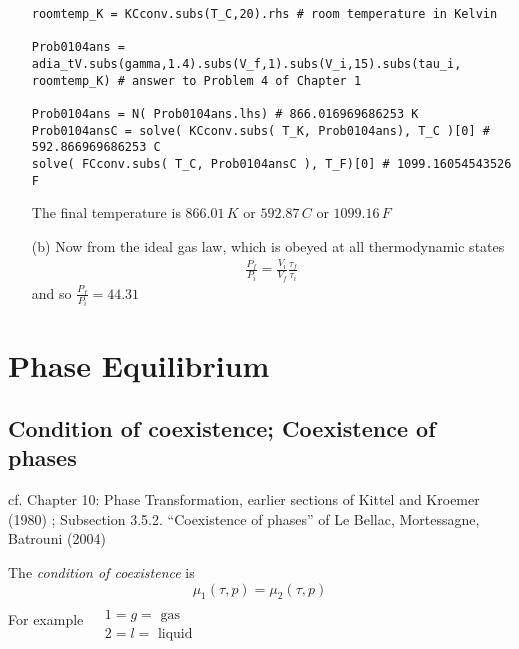 \documentclass[10pt]{amsart}
\begin{document}
\begin{multicols*}{2}
\begin{enumerate}
\begin{lstlisting}
roomtemp_K = KCconv.subs(T_C,20).rhs # room temperature in Kelvin                               

Prob0104ans = adia_tV.subs(gamma,1.4).subs(V_f,1).subs(V_i,15).subs(tau_i, roomtemp_K) # answer to Problem 4 of Chapter 1                                                                           

Prob0104ans = N( Prob0104ans.lhs) # 866.016969686253 K                                         
Prob0104ansC = solve( KCconv.subs( T_K, Prob0104ans), T_C )[0] # 592.866969686253 C            
solve( FCconv.subs( T_C, Prob0104ansC ), T_F)[0] # 1099.16054543526 F   
\end{lstlisting}

The final temperature is $866.01 \, K$ or $592.87 \, C$ or $1099.16 \, F$

\item[(b)] Now from the ideal gas law, which is obeyed at all thermodynamic states
\[
\begin{gathered}
  \frac{P_f}{ P_i} = \frac{V_i}{V_f} \frac{ \tau_f}{ \tau_i}
\end{gathered}
\]
and so $\frac{P_f}{P_i} = 44.31$
\end{enumerate}


\section{Phase Equilibrium}

\subsection{Condition of coexistence; Coexistence of phases}

cf. Chapter 10: Phase Transformation, earlier sections of Kittel and Kroemer (1980) \cite{CKittelHKroemer1980}; Subsection 3.5.2. ``Coexistence of phases'' of Le Bellac, Mortessagne, Batrouni (2004) \cite{MLeBellacFMortessagneGBatrouni2004}

The \emph{condition of coexistence} is 
\[
\mu_1(\tau,p) = \mu_2(\tau,p)
\]
For example $\begin{aligned} & \quad \\
  & 1 = g = \text{ gas } \\
  & 2 = l = \text{ liquid } \end{aligned}$


\end{multicols*}
\end{document}
